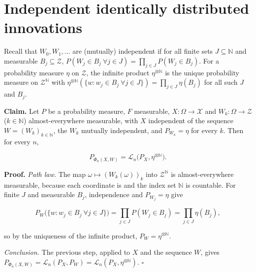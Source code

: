 \documentclass[11pt,a4paper]{article}
\begin{document}
\section{\texorpdfstring{Independent identically distributed innovations}{Independent identically distributed innovations}}


Recall that \(W_0,W_1,\dots\) are (mutually) independent if for all finite sets \(J\subseteq\mathbb N\) and measurable \(B_j\subseteq\mathcal Z\), \(P(W_j\in B_j\ \forall j\in J)=\prod_{j\in J}P(W_j\in B_j)\). For a probability measure \(\eta\) on \(\mathcal Z\), the infinite product \(\eta^{\otimes\mathbb N}\) is the unique probability measure on \(\mathcal Z^{\mathbb N}\) with \(\eta^{\otimes\mathbb N}(\{w:w_j\in B_j\ \forall j\in J\})=\prod_{j\in J}\eta(B_j)\) for all such \(J\) and \(B_j\).




\textbf{Claim.} Let \(P\) be a probability measure, \(F\) measurable, \(X:\Omega\to\mathcal X\) and \(W_k:\Omega\to\mathcal Z\) (\(k\in\mathbb N\)) almost-everywhere measurable, with \(X\) independent of the sequence \(W=(W_k)_{k\in\mathbb N}\), the \(W_k\) mutually independent, and \(P_{W_k}=\eta\) for every \(k\). Then for every \(n\),


\[P_{\Phi_n(X,W)}=\mathcal L_n\bigl(P_X,\eta^{\otimes\mathbb N}\bigr).\]


\textbf{Proof.} \emph{Path law.} The map \(\omega\mapsto(W_k(\omega))_{k}\) into \(\mathcal Z^{\mathbb N}\) is almost-everywhere measurable, because each coordinate is and the index set \(\mathbb N\) is countable. For finite \(J\) and measurable \(B_j\), independence and \(P_{W_j}=\eta\) give


\[P_W\bigl(\{w:w_j\in B_j\ \forall j\in J\}\bigr)=\prod_{j\in J}P(W_j\in B_j)=\prod_{j\in J}\eta(B_j),\]


so by the uniqueness of the infinite product, \(P_W=\eta^{\otimes\mathbb N}\).




\emph{Conclusion.} The previous step, applied to \(X\) and the sequence \(W\), gives \(P_{\Phi_n(X,W)}=\mathcal L_n(P_X,P_W)=\mathcal L_n(P_X,\eta^{\otimes\mathbb N})\). \(\square\)
\end{document}
